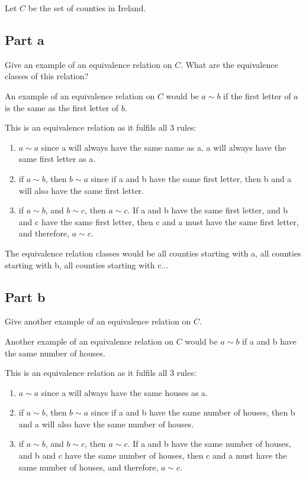 \documentclass[12pt]{article} %
\begin{document}
\pagebreak

\begin{homeworkProblem}
    Let $C$ be the set of counties in Ireland.

    \subsection*{Part a}

    \begin{grayBoxed}
        Give an example of an equivalence relation on $C$. What are the equivalence classes of this relation?
    \end{grayBoxed}

    An example of an equivalence relation on $C$ would be $a \sim b$ if the first letter of $a$ is the same as the first letter of $b$.

    This is an equivalence relation as it fulfils all 3 rules:
    \begin{enumerate}
        \item $a \sim a$ since a will always have the same name as a, a will always have the same first letter as a.
        \item if $a \sim b$, then $b \sim a$ since if a and b have the same first letter, then b and a will also have the same  first letter.
        \item if $a \sim b$, and $b \sim c$, then $a \sim c$. If a and b have the same first letter, and b and c have the same first letter, then c and a must have the same first letter, and therefore, $a \sim c$.
    \end{enumerate}

    The equivalence relation classes would be all counties starting with a, all counties starting with b, all counties starting with c...

    \subsection*{Part b}

    \begin{grayBoxed}
        Give another example of an equivalence relation on $C$.
    \end{grayBoxed}

    Another example of an equivalence relation on $C$ would be $a \sim b$ if a and b have the same number of houses.

    This is an equivalence relation as it fulfils all 3 rules:
    \begin{enumerate}
        \item $a \sim a$ since a will always have the same houses as a.
        \item if $a \sim b$, then $b \sim a$ since if a and b have the same number of houses, then b and a will also have the same number of houses.
        \item if $a \sim b$, and $b \sim c$, then $a \sim c$. If a and b have the same number of houses, and b and c have the same number of houses, then c and a must have the same number of houses, and therefore, $a \sim c$.
    \end{enumerate}


\end{homeworkProblem}
\end{document}
